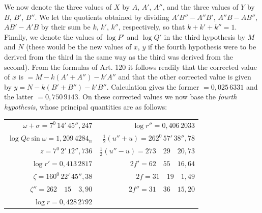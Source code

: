 We now denote the three values of $X$ by $A$, $A'$, $A''$, and the three values of $Y$
by $B$, $B'$, $B''$. We let the quotients obtained by dividing $A'B''-A''B'$, $A''B-AB''$,
$AB'-A'B$ by their sum be $k$, $k'$, $k''$, respectively, so that $k+k'+k''=1$. Finally, we denote the values of $\log P'$ and $\log Q'$ in the third
hypothesis by $M$ and $N$ (these would be the new values of $x$, $y$ if the fourth
hypothesis were to be derived from the third in the same way as the third was
derived from the second). From the formulas of Art. 120 it follows readily that the corrected value of $x$ is
$=M-k(A'+A'')-k'A''$ and that the other corrected value is given by $y = N-k(B'+B'')-k'B''$.
Calculation gives the former $=0{,}025\,6331$ and the latter $=0{,}750\,9143$. On these corrected values we now base the \emph{fourth hypothesis}, whose principal quantities are as follows:
\begin{center}\begingroup\footnotesize\setlength{\tabcolsep}{3pt}\renewcommand{\arraystretch}{1.3}
\begin{tabular}{r|r}
$\omega + \sigma=7^0\,14'\,45''{,}247$ & $\log r''=0{,}406\,2033$\\
$\log Qc\sin\omega=1{,}209\,4284_n$ & $\tfrac12(u''+u)=262^0\,57'\,38''{,}78$\\
$z=7^0\,2'\,12''{,}736$ & $\tfrac12(u''-u)=273\quad29\quad20{,}73$\\
$\log r'=0{,}413\,2817$ & $2f'=62\quad55\quad16{,}64$\\
$\zeta=160^0\,22'\,45''{,}38$ & $2f=31\quad19\quad1{,}49$\\
$\zeta''=262\quad15\quad3{,}90$ & $2f''=31\quad36\quad15{,}20$\\
$\log r=0{,}428\,2792$ & \\
\end{tabular}
\endgroup\end{center}

